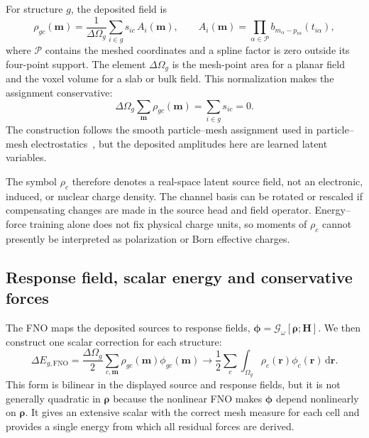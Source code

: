 \documentclass[11pt]{article}
\begin{document}
For structure \(g\), the deposited field is
\begin{equation}
 \rho_{gc}(\mathbf m)
 =\frac{1}{\Delta\Omega_g}
 \sum_{i\in g}s_{ic}\,A_i(\mathbf m),\qquad
 A_i(\mathbf m)=\prod_{\alpha\in\mathcal P}
 b_{m_\alpha-p_{i\alpha}}(t_{i\alpha}),
 \label{eq:latent-source-field}
\end{equation}
where \(\mathcal P\) contains the meshed coordinates and a spline factor is
zero outside its four-point support. The element \(\Delta\Omega_g\) is the
mesh-point area for a planar field and the voxel volume for a slab or bulk
field. This normalization makes the assignment conservative:
\begin{equation}
 \Delta\Omega_g\sum_{\mathbf m}\rho_{gc}(\mathbf m)
 =\sum_{i\in g}s_{ic}=0.
 \label{eq:mesh-neutrality}
\end{equation}
The construction follows the smooth particle--mesh assignment used in
particle--mesh electrostatics~\citep{darden1993pme,essmann1995pme}, but the
deposited amplitudes here are learned latent variables.

The symbol \(\rho_c\) therefore denotes a real-space latent source field, not
an electronic, induced, or nuclear charge density. The channel basis can be
rotated or rescaled if compensating changes are made in the source head and
field operator. Energy--force training alone does not fix physical charge
units, so moments of \(\rho_c\) cannot presently be interpreted as
polarization or Born effective charges.

\subsection{Response field, scalar energy and conservative forces}

The FNO maps the deposited sources to response fields,
\(\boldsymbol\phi=\mathcal G_\omega[\boldsymbol\rho;\mathbf H]\). We then
construct one scalar correction for each structure:
\begin{equation}
 \Delta E_{g,\mathrm{FNO}}
 =\frac{\Delta\Omega_g}{2}
 \sum_{c,\mathbf m}\rho_{gc}(\mathbf m)\phi_{gc}(\mathbf m)
 \longrightarrow
 \frac{1}{2}\sum_c\int_{\Omega_g}
 \rho_c(\mathbf r)\phi_c(\mathbf r)\,\mathrm d\mathbf r.
 \label{eq:mesh-energy}
\end{equation}
This form is bilinear in the displayed source and response fields, but it is
not generally quadratic in \(\boldsymbol\rho\) because the nonlinear FNO
makes \(\boldsymbol\phi\) depend nonlinearly on
\(\boldsymbol\rho\). It gives an extensive scalar with the correct mesh
measure for each cell and provides a single energy from which all residual
forces are derived.
\end{document}
